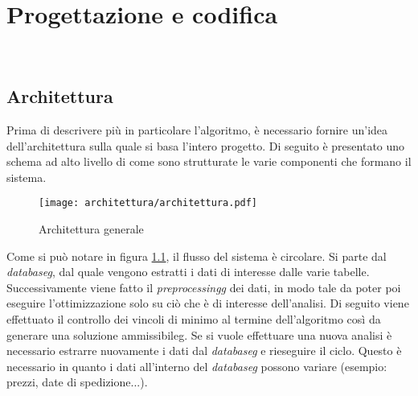 
\chapter{Progettazione e codifica}
\label{cap:progettazione-codifica}

\noindent {}\\

\section{Architettura}
\label{sec:progettazione}
\noindent Prima di descrivere più in particolare l'algoritmo, è necessario
fornire un’idea dell’architettura sulla quale si basa l'intero progetto.
Di seguito è presentato uno schema ad alto livello di come sono strutturate le varie
componenti che formano il sistema.

\begin{figure}[!h] 
    \centering 
    \texttt{[image: architettura/architettura.pdf]} 
    \caption{Architettura generale}
    \label{architettura-generale}
\end{figure}

\noindent Come si può notare in figura \ref{architettura-generale},
il flusso del sistema è circolare.
Si parte dal \textit{\gls{databaseg}}, dal quale vengono estratti i dati di interesse dalle varie
tabelle. Successivamente viene fatto il \textit{\gls{preprocessingg}} dei dati,
in modo tale da poter poi eseguire l'ottimizzazione solo su
ciò che è di interesse dell'analisi.
Di seguito viene effettuato il controllo dei vincoli di minimo al termine
dell'algoritmo così da generare
una soluzione \gls{ammissibileg}. Se si vuole effettuare una nuova
analisi è necessario estrarre nuovamente i dati dal
\textit{\gls{databaseg}} e rieseguire il ciclo. Questo è necessario
in quanto i dati all'interno del \textit{\gls{databaseg}} possono variare
(esempio: prezzi, date di spedizione...).

\newpage


